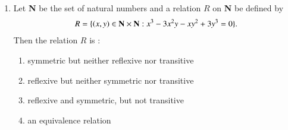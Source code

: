 \documentclass[journal]{IEEEtran}
\begin{document}
\begin{enumerate}
\begin{enumerate}
\end{enumerate}
\item Let \textbf{N} be the set of natural numbers and a relation $R$ on \textbf{N} be defined by 
\begin{align*}
 R = \{ \left(x, y\right) \in \textbf{N} \times \textbf{N}: x^3 - 3x^2y - xy^2 + 3y^3 = 0 \}.
\end{align*}
Then the relation $R$ is :
\begin{enumerate}
    \item symmetric but neither reflexive nor transitive
    \item reflexive but neither symmetric nor transitive
    \item reflexive and symmetric, but not transitive
    \item an equivalence relation\\
\end{enumerate}
			 \end{enumerate}
			 
\end{document}
